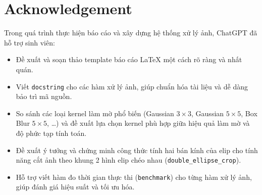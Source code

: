\section{Acknowledgement}
Trong quá trình thực hiện báo cáo và xây dựng hệ thống xử lý ảnh, ChatGPT đã hỗ trợ sinh viên:

\begin{itemize}
	\item Đề xuất và soạn thảo template báo cáo LaTeX một cách rõ ràng và nhất quán.
	\item Viết \texttt{docstring} cho các hàm xử lý ảnh, giúp chuẩn hóa tài liệu và dễ dàng bảo trì mã nguồn.
	\item So sánh các loại kernel làm mờ phổ biến (Gaussian \(3\times3\), Gaussian \(5\times5\), Box Blur \(5\times5\), \ldots) và đề xuất lựa chọn kernel phù hợp giữa hiệu quả làm mờ và độ phức tạp tính toán.
	\item Đề xuất ý tưởng và chứng minh công thức tính hai bán kính của elip cho tính năng cắt ảnh theo khung 2 hình elip chéo nhau (\texttt{double\_ellipse\_crop}).
	\item Hỗ trợ viết hàm đo thời gian thực thi (\texttt{benchmark}) cho từng hàm xử lý ảnh, giúp đánh giá hiệu suất và tối ưu hóa.
\end{itemize}

